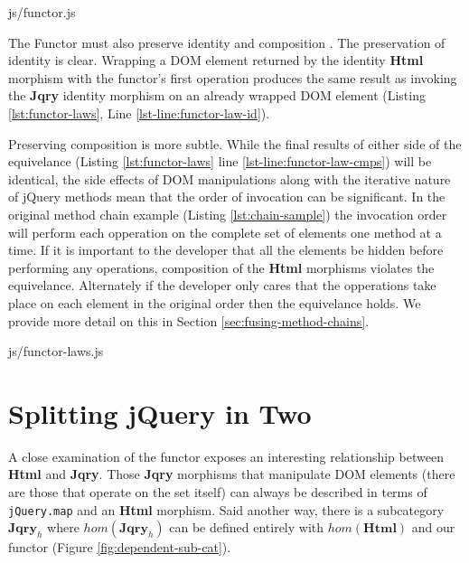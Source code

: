 \documentclass[preprint, leqno]{sigplanconf}
\begin{document}
\begin{lstinputlisting}[
    language=JavaScript,
    caption={Functor from Html to Jqry},
    label={lst:functor},
    escapeinside={@}{@}
]{js/functor.js}
\end{lstinputlisting}

The Functor must also preserve identity and composition \cite[p. ~36]{bib:category-definition}. The preservation of identity is clear. Wrapping a DOM element returned by the identity \textbf{Html} morphism with the functor's first operation produces the same result as invoking the \textbf{Jqry} identity morphism on an already wrapped DOM element (Listing \ref{lst:functor-laws}, Line \ref{lst-line:functor-law-id}).

Preserving composition is more subtle. While the final results of either side of the equivelance (Listing \ref{lst:functor-laws} line \ref{lst-line:functor-law-cmps}) will be identical, the side effects of DOM manipulations along with the iterative nature of jQuery methods mean that the order of invocation can be significant. In the original method chain example (Listing \ref{lst:chain-sample}) the invocation order will perform each opperation on the complete set of elements one method at a time.  If it is important to the developer that all the elements be hidden before performing any operations, composition of the \textbf{Html} morphisms violates the equivelance. Alternately if the developer only cares that the opperations take place on each element in the original order then the equivelance holds. We provide more detail on this in Section \ref{sec:fusing-method-chains}.

\begin{lstinputlisting}[
    language=JavaScript,
    caption={Satisfying the Functor Laws},
    label={lst:functor-laws},
    escapeinside={@}{@}
]{js/functor-laws.js}
\vspace{-10pt}
\end{lstinputlisting}

\section{Splitting jQuery in Two}

A close examination of the functor exposes an interesting relationship between \textbf{Html} and \textbf{Jqry}. Those \textbf{Jqry} morphisms that manipulate DOM elements (there are those that operate on the set itself) can always be described in terms of \verb|jQuery.map| and an \textbf{Html} morphism. Said another way, there is a subcategory \begin{math}\mathbf{Jqry}_{h}\end{math} where \begin{math}hom(\mathbf{Jqry}_{h})\end{math} can be defined entirely with \begin{math}hom(\mathbf{Html})\end{math} and our functor (Figure \ref{fig:dependent-sub-cat}).
\end{document}
